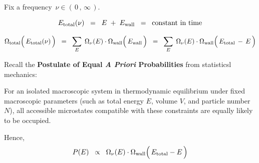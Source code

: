 \vskip 0.3cm
\noindent
Fix a frequency \,$\nu \in (\,0\,,\,\infty\,)$.\,

\begin{equation*}
E_{\textnormal{total}}(\nu)
\;\; = \;\;
    E
    \; + \;
    E_{\textnormal{wall}}
\;\; = \;\;
    \textnormal{constant in time}
\end{equation*}

\begin{equation*}
\Omega_{\textnormal{total}}\!\left(\,\overset{{\color{white}.}}{
    E_{\textnormal{total}}(\nu)
    }\,\right)
\;\; = \;\;
    \underset{E}{\sum}\;\,
    \Omega_{\nu}(E)
    \cdot
    \Omega_{\textnormal{wall}}\!\left(\,\overset{{\color{white}.}}{
        E_{\textnormal{wall}}
        }\,\right)
\;\; = \;\;
    \underset{E}{\sum}\;\,
    \Omega_{\nu}(E)
    \cdot
    \Omega_{\textnormal{wall}}\!\left(\,\overset{{\color{white}.}}{
        E_{\textnormal{total}} \,-\, E
        }\,\right)
\end{equation*}

\vskip 0.3cm
\noindent
Recall the
\textbf{Postulate of Equal \textit{A Priori} Probabilities}
from statisticsl mechanics:
\begin{center}
\begin{minipage}{5.5in}
For an isolated macroscopic system in thermodynamic equilibrium
under fixed macroscopic parameters
(such as total energy $E$, volume $V$, and particle number $N$),
all accessible microstates compatible with these constraints
are equally likely to be occupied.
\end{minipage}
\end{center}
\vskip 0.4cm
\noindent
Hence,
\begin{equation*}
P(E)
\;\; \propto \;\;
    \Omega_{\nu}(E)
    \cdot
    \Omega_{\textnormal{wall}}\!\left(\,\overset{{\color{white}.}}{
        E_{\textnormal{total}}-E
        }\,\right)
\end{equation*}

